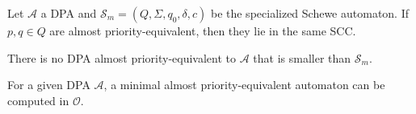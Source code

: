 \begin{lem}
	Let $\mathcal{A}$ a DPA and $\mathcal{S}_m = (Q, \Sigma, q_0, \delta, c)$ be the specialized Schewe automaton. If $p, q \in Q$ are almost priority-equivalent, then they lie in the same SCC.
\end{lem}

\begin{lem}
	There is no DPA almost priority-equivalent to $\mathcal{A}$ that is smaller than $\mathcal{S}_m$.
\end{lem}

\begin{theorem}
	For a given DPA $\mathcal{A}$, a minimal almost priority-equivalent automaton can be computed in $\mathcal{O}$. 
\end{theorem}
	



